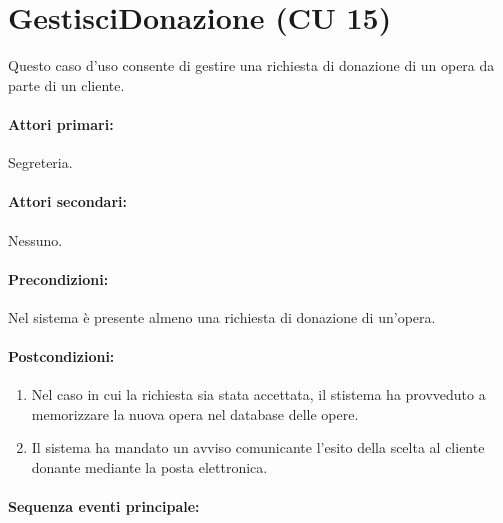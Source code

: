 \documentclass{article}
\begin{document}
\newpage
\section*{GestisciDonazione (CU 15)}
	
	\indent\indent Questo caso d'uso consente di gestire una richiesta di donazione di un opera da parte di un cliente.
	
	\paragraph{Attori primari:}Segreteria.
	
	\paragraph{Attori secondari:}Nessuno.
	
	\paragraph{Precondizioni:}Nel sistema è presente almeno una richiesta di donazione di un'opera.
	
	\paragraph{Postcondizioni:}
	\begin{enumerate}[itemsep=8pt,parsep=0pt]

		\item Nel caso in cui la richiesta sia stata accettata, il stistema ha provveduto a memorizzare la nuova opera nel database delle opere.
		\item Il sistema ha mandato un avviso comunicante l'esito della scelta al cliente donante mediante la posta elettronica.

	\end{enumerate}
	
	\paragraph{Sequenza eventi principale:}
\end{document}
